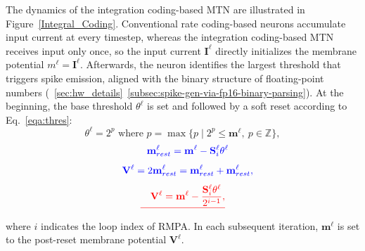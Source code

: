 The dynamics of the integration coding-based MTN are illustrated in Figure~\ref{Integral_Coding}. Conventional rate coding-based neurons accumulate input current at every timestep, whereas the integration coding-based MTN receives input only once, so the input current $\mathbf{I}^\ell$ directly initializes the membrane potential $m^\ell = \mathbf{I}^\ell$.
Afterwards, the neuron identifies the largest 
threshold that triggers spike emission, aligned with the binary structure of floating-point numbers 
(~\ref{sec:hw_details}~\ref{subsec:spike-gen-via-fp16-binary-parsing}\deleted{)}). At the beginning, the base threshold $\theta^\ell$ is set and followed by a soft reset according to Eq.~\eqref{eqa:thres}:
\begin{equation}
\label{eqa:thres}
\theta^\ell = 2^p \text{ where } p = \max\{p \mid 2^p \leq \mathbf{m}^\ell,\ p \in \mathbb{Z}\},
\end{equation}
\begin{equation}
\label{eqa:reset}
\textcolor{blue}{\quad\mathbf{m}_{rest}^\ell =\mathbf{m}^\ell - \mathbf{S}_i^\ell \theta^\ell}
\end{equation}
\begin{equation}
\textcolor{blue}{\quad\mathbf{V}^\ell =2\mathbf{m}_{rest}^\ell=\mathbf{m}_{rest}^\ell+\mathbf{m}_{rest}^\ell,}
\end{equation}
\begin{equation}
\deleted{\quad\mathbf{V}^\ell = \mathbf{m}^\ell - \frac{\mathbf{S}_i^\ell \theta^\ell}{2^{i-1}},}
\end{equation}
where $i$ indicates the loop index of RMPA.
In each subsequent iteration, $\mathbf{m}^\ell$ is set to the post-reset membrane potential $\mathbf{V}^\ell$.


